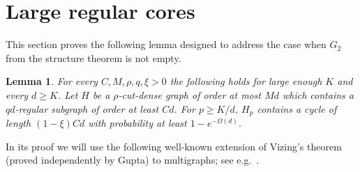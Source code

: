 \documentclass[10pt]{article}
\newtheorem{lemma}[theorem]{Lemma}
\theoremstyle{definition}
\let\geq\geqslant
\begin{document}
\section{Large regular cores}
This section proves the following lemma designed to address the case when $G_2$ from the structure theorem is not empty.

\begin{lemma}\label{lem:cut-dense case} For every $C,M,\rho,q,\xi>0$ the following holds for large enough $K$ and every $d\geq K$. Let $H$ be a $\rho$-cut-dense graph of order at most $Md$ which contains a $qd$-regular subgraph of order at least $Cd$. For $p\geq K/d$, $H_p$ contains a cycle of length $(1-\xi)Cd$ with probability at least $1-e^{-\Omega(d)}$.
\end{lemma}

In its proof we will use the following well-known extension of Vizing's theorem (proved independently by Gupta) to multigraphs; see e.g.\ \cite[Theorem 3.4.4]{MR5044348}.
\end{document}
